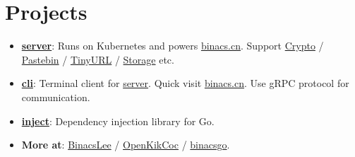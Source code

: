 \documentclass[letterpaper,12pt]{article}
\newcommand{\resumeItem}[2]{
  \item\small{
    \textbf{#1}{: #2 \vspace{-2pt}}
  }
}
\newcommand{\resumeSubItem}[2]{\resumeItem{#1}{#2}\vspace{-4pt}}
\newcommand{\resumeSubHeadingListStart}{\begin{itemize}[leftmargin=*]}
\newcommand{\resumeSubHeadingListEnd}{\end{itemize}}
\begin{document}
\section{Projects}
  \resumeSubHeadingListStart
    \resumeSubItem{\href{https://github.com/BinacsLee/server}{server}}
      {Runs on Kubernetes and powers \href{https://binacs.cn/}{binacs.cn}.
      Support   \href{https://binacs.cn/toys/crypto}{Crypto} / 
                \href{https://binacs.cn/toys/pastebin}{Pastebin} / 
                \href{https://binacs.cn/toys/tinyurl}{TinyURL} / 
                \href{https://binacs.cn/toys/storage}{Storage}
      etc.}
    \resumeSubItem{\href{https://github.com/BinacsLee/cli}{cli}}
      {Terminal client for \href{https://github.com/BinacsLee/server}{server}. Quick visit
      \href{https://binacs.cn/}{binacs.cn}. Use gRPC protocol for communication.}
    \resumeSubItem{\href{https://github.com/binacsgo/inject}{inject}}
      {Dependency injection library for Go.}
    \resumeSubItem{More at}
      {\href{https://github.com/BinacsLee}{BinacsLee} /
       \href{https://github.com/OpenKikCoc}{OpenKikCoc} /
       \href{https://github.com/binacsgo}{binacsgo}.}
  \resumeSubHeadingListEnd

\end{document}
